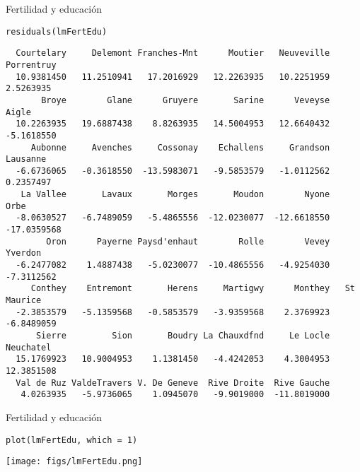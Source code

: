 \documentclass[xcolor={usenames,svgnames,dvipsnames}]{beamer}
\begin{document}
\begin{frame}[fragile,label={sec:org84c0b44}]{Fertilidad y educación}
 \lstset{language=r,label= ,caption= ,captionpos=b,numbers=none}
\begin{lstlisting}
residuals(lmFertEdu)
\end{lstlisting}

\begin{verbatim}
  Courtelary     Delemont Franches-Mnt      Moutier   Neuveville   Porrentruy 
  10.9381450   11.2510941   17.2016929   12.2263935   10.2251959    2.5263935 
       Broye        Glane      Gruyere       Sarine      Veveyse        Aigle 
  10.2263935   19.6887438    8.8263935   14.5004953   12.6640432   -5.1618550 
     Aubonne     Avenches     Cossonay    Echallens     Grandson     Lausanne 
  -6.6736065   -0.3618550  -13.5983071   -9.5853579   -1.0112562    0.2357497 
   La Vallee       Lavaux       Morges       Moudon        Nyone         Orbe 
  -8.0630527   -6.7489059   -5.4865556  -12.0230077  -12.6618550  -17.0359568 
        Oron      Payerne Paysd'enhaut        Rolle        Vevey      Yverdon 
  -6.2477082    1.4887438   -5.0230077  -10.4865556   -4.9254030   -7.3112562 
     Conthey    Entremont       Herens     Martigwy      Monthey   St Maurice 
  -2.3853579   -5.1359568   -0.5853579   -3.9359568    2.3769923   -6.8489059 
      Sierre         Sion       Boudry La Chauxdfnd     Le Locle    Neuchatel 
  15.1769923   10.9004953    1.1381450   -4.4242053    4.3004953   12.3851508 
  Val de Ruz ValdeTravers V. De Geneve  Rive Droite  Rive Gauche 
   4.0263935   -5.9736065    1.0945070   -9.9019000  -11.8019000
\end{verbatim}
\end{frame}

\begin{frame}[fragile,label={sec:orgbe5260d}]{Fertilidad y educación}
 \lstset{language=r,label= ,caption= ,captionpos=b,numbers=none}
\begin{lstlisting}
plot(lmFertEdu, which = 1)
\end{lstlisting}

\begin{center}
\texttt{[image: figs/lmFertEdu.png]}
\end{center}
\end{frame}
\end{document}
